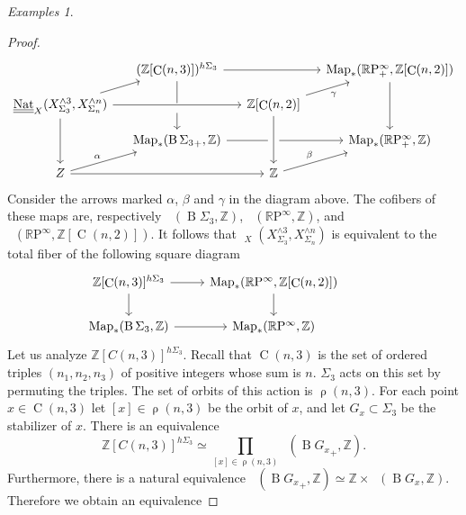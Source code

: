 \documentclass[psamsfonts]{amsart}
\theoremstyle{plain}
\theoremstyle{definition}
\theoremstyle{remark}
\newtheorem{exmps}[thm]{Examples}
\newcommand{\Z}{\mathbb{Z}}
\newcommand{\RP}{\mathbb{R}\mathrm{P}}
\newcommand{\classifying}{\operatorname{B}}
\DeclareMathOperator{\map}{Map}
\DeclareMathOperator{\pointedmaps}{\map_*}
\DeclareMathOperator{\nat}{Nat}
\DeclareMathOperator{\spectralNat}{\underline{\underline{\nat}}}
\DeclareMathOperator{\Part}{\rho}
\DeclareMathOperator{\Comp}{C}
\begin{document}
\begin{exmps}
\begin{proof}
\[\begin{tikzcd}[sep=small]
	& {(\Z[\Comp(n, 3)])^{h\Sigma_3}} && {\pointedmaps(\RP^\infty_+, \Z[\Comp(n, 2)])} \\
	{\spectralNat_X(X^{\wedge 3}_{\Sigma_3}, X^{\wedge n}_{\Sigma_n})} & {} & {\Z[\Comp(n, 2)]} \\
	& {\pointedmaps({\classifying \Sigma_3}_+, \Z)} & {} & {\pointedmaps(\RP^\infty_+, \Z)} \\
	{ Z} && {\Z}
	\arrow[from=1-2, to=1-4]
	\arrow[no head, from=1-2, to=2-2]
	\arrow[from=1-4, to=3-4]
	\arrow[from=2-1, to=1-2]
	\arrow[from=2-1, to=2-3]
	\arrow[from=2-1, to=4-1]
	\arrow[from=2-2, to=3-2]
	\arrow[swap, "\gamma", from=2-3, to=1-4]
	\arrow[""{name=0, anchor=center, inner sep=0}, from=2-3, to=4-3]
	\arrow[from=3-3, to=3-4]
	\arrow["\alpha", from=4-1, to=3-2]
	\arrow[from=4-1, to=4-3]
	\arrow["\beta", from=4-3, to=3-4]
	\arrow[no head, from=3-2, to=3-3]
\end{tikzcd}\]
Consider the arrows marked $\alpha$, $\beta$ and $\gamma$ in the diagram above. The cofibers of these maps are, respectively $\pointedmaps(\classifying\Sigma_3, \Z)$, $\pointedmaps(\RP^\infty, \Z)$, and $\pointedmaps(\RP^\infty, \Z[\Comp(n, 2)])$. It follows that $\spectralNat_X(X^{\wedge 3}_{\Sigma_3}, X^{\wedge n}_{\Sigma_n})$ is equivalent to the total fiber of the following square diagram
\begin{equation}\label{eq:flattened cube}
\begin{tikzcd}
	{\Z[\Comp(n,3)]^{h\Sigma_3}} & {\pointedmaps(\RP^\infty, \Z[\Comp(n,2)])} & {} \\
	{\pointedmaps({\classifying \Sigma_3}, \Z)} & {\pointedmaps(\RP^\infty, \Z)}
	\arrow[from=1-1, to=1-2]
	\arrow[from=1-1, to=2-1]
	\arrow[from=1-2, to=2-2]
	\arrow[from=2-1, to=2-2]
\end{tikzcd}
\end{equation}
Let us analyze $\Z[C(n, 3)]^{h\Sigma_3}$.
Recall that $\Comp(n, 3)$ is the set of ordered triples $(n_1, n_2, n_3)$ of positive integers whose sum is $n$. $\Sigma_3$ acts on this set by permuting the triples. The set of orbits of this action is $\Part(n, 3)$. For each point $x\in \Comp(n, 3)$ let $[x]\in \Part(n, 3)$ be the orbit of $x$, and let $G_x\subset \Sigma_3$ be the stabilizer of $x$. There is an equivalence
\[
\Z[C(n, 3)]^{h\Sigma_3} \simeq \prod_{[x]\in \Part(n, 3)}\pointedmaps (\classifying {G_x}_+,\Z).
\]
Furthermore, there is a natural equivalence $\pointedmaps(\classifying {G_x}_+, \Z)\simeq \Z\times \pointedmaps(\classifying G_x, \Z).$ Therefore we obtain an equivalence

\end{proof}
\end{exmps}
\end{document}
